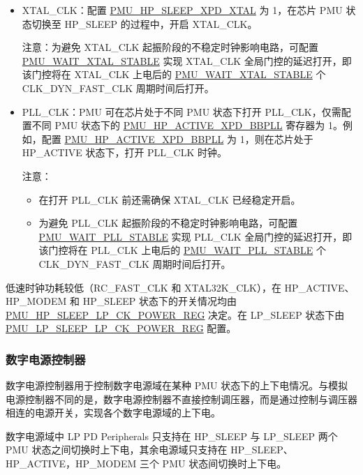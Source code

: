 \documentclass[main\_\_CN.tex]{subfiles}
\begin{document}
\begin{itemize}
    \item XTAL\_CLK：配置 \hyperref[fielddesc:PMUHPSLEEPXPDXTAL]{PMU\_HP\_SLEEP\_XPD\_XTAL} 为 1，在芯片 PMU 状态切换至 HP\_SLEEP 的过程中，开启 XTAL\_CLK。

    注意：为避免 XTAL\_CLK 起振阶段的不稳定时钟影响电路，可配置 \hyperref[fielddesc:PMUWAITXTALSTABLE]{PMU\_WAIT\_XTAL\_STABLE} 实现 XTAL\_CLK 全局门控的延迟打开，即该门控将在 XTAL\_CLK 上电后的 \hyperref[fielddesc:PMUWAITXTALSTABLE]{PMU\_WAIT\_XTAL\_STABLE} 个 CLK\_DYN\_FAST\_CLK 周期时间后打开。

    \item PLL\_CLK：PMU 可在芯片处于不同 PMU 状态下打开 PLL\_CLK，仅需配置不同 PMU 状态下的 \hyperref[fielddesc:PMUHPACTIVEXPDBBPLL]{PMU\_HP\_ACTIVE\_XPD\_BBPLL} 寄存器为 1。例如，配置 \hyperref[fielddesc:PMUHPACTIVEXPDBBPLL]{PMU\_HP\_ACTIVE\_XPD\_BBPLL} 为 1，则在芯片处于 HP\_ACTIVE 状态下，打开 PLL\_CLK 时钟。

    注意：
    \begin{itemize}
        \item 在打开 PLL\_CLK 前还需确保 XTAL\_CLK 已经稳定开启。
        \item 为避免 PLL\_CLK 起振阶段的不稳定时钟影响电路，可配置 \hyperref[fielddesc:PMUWAITPLLSTABLE]{PMU\_WAIT\_PLL\_STABLE} 实现 PLL\_CLK 全局门控的延迟打开，即该门控将在 PLL\_CLK 上电后的 \hyperref[fielddesc:PMUWAITPLLSTABLE]{PMU\_WAIT\_PLL\_STABLE} 个CLK\_DYN\_FAST\_CLK 周期时间后打开。
    \end{itemize}
\end{itemize}

低速时钟功耗较低（RC\_FAST\_CLK 和 XTAL32K\_CLK），在 HP\_ACTIVE、HP\_MODEM 和 HP\_SLEEP 状态下的开关情况均由 \hyperref[regdesc:PMUHPSLEEPLPCKPOWERREG]{PMU\_HP\_SLEEP\_LP\_CK\_POWER\_REG} 决定。在 LP\_SLEEP 状态下由 \hyperref[regdesc:PMULPSLEEPLPCKPOWERREG]{PMU\_LP\_SLEEP\_LP\_CK\_POWER\_REG} 配置。

\subsubsection{数字电源控制器}

数字电源控制器用于控制数字电源域在某种 PMU 状态下的上下电情况。与模拟电源控制器不同的是，数字电源控制器不直接控制调压器，而是通过控制与调压器相连的电源开关，实现各个数字电源域的上下电。

数字电源域中 LP PD Peripherals 只支持在 HP\_SLEEP 与 LP\_SLEEP 两个 PMU 状态之间切换时上下电，其余电源域只支持在 HP\_SLEEP、HP\_ACTIVE，HP\_MODEM 三个 PMU 状态间切换时上下电。
\end{document}

